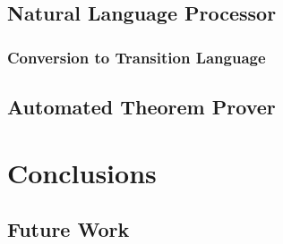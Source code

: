 \documentclass[12pt]{article}
\begin{document}
\subsection{Natural Language Processor}
\subsubsection{Conversion to Transition Language}
\subsection{Automated Theorem Prover}

\section{Conclusions}
\subsection{Future Work}

\end{document}
